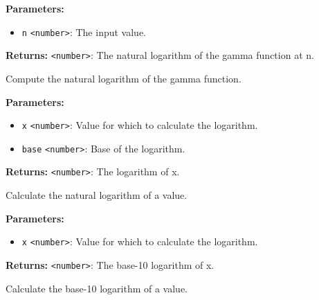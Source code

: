 \documentclass[12pt,a4paper]{article}
\begin{document}
\vspace{5mm}
\noindent {}


\noindent \textbf{Parameters:}
\begin{itemize}
  \item \texttt{n} \texttt{<number>}: The input value.
\end{itemize}

\noindent \textbf{Returns:} \texttt{<number>}: The natural logarithm of the gamma function at n.

\noindent Compute the natural logarithm of the gamma function.

\vspace{5mm}
\noindent {}


\noindent \textbf{Parameters:}
\begin{itemize}
  \item \texttt{x} \texttt{<number>}: Value for which to calculate the logarithm.
  \item \texttt{base} \texttt{<number>}: Base of the logarithm.
\end{itemize}

\noindent \textbf{Returns:} \texttt{<number>}: The logarithm of x.

\noindent Calculate the natural logarithm of a value.

\vspace{5mm}
\noindent {}


\noindent \textbf{Parameters:}
\begin{itemize}
  \item \texttt{x} \texttt{<number>}: Value for which to calculate the logarithm.
\end{itemize}

\noindent \textbf{Returns:} \texttt{<number>}: The base-10 logarithm of x.

\noindent Calculate the base-10 logarithm of a value.

\vspace{5mm}
\noindent {}
\end{document}
